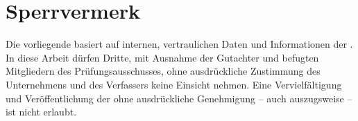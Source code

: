 \section*{Sperrvermerk}
Die vorliegende \varArbeit \space basiert auf internen, vertraulichen Daten und Informationen der \varUnternehmen.
In diese Arbeit dürfen Dritte, mit Ausnahme der Gutachter und befugten Mitgliedern des Prüfungsausschusses,
ohne ausdrückliche Zustimmung des Unternehmens und des Verfassers keine Einsicht nehmen. Eine Vervielfältigung
und Veröffentlichung der \varArbeit \space ohne ausdrückliche Genehmigung – auch auszugsweise – ist nicht erlaubt.
\clearpage